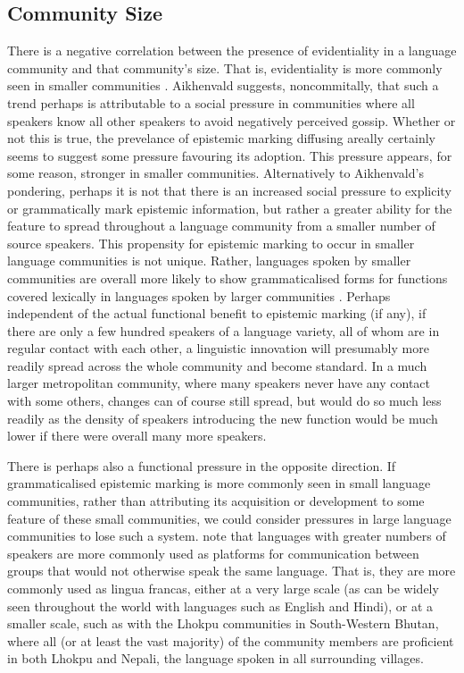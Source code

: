 \subsection{Community Size}\label{ss:History:CommunitySize}
There is a negative correlation between the presence of evidentiality in a language community and that community's size. That is, evidentiality is more commonly seen in smaller communities \cite[359]{Aikhenvald2004}. Aikhenvald suggests, noncommitally, that such a trend perhaps is attributable to a social pressure in communities where all speakers know all other speakers to avoid negatively perceived gossip. Whether or not this is true, the prevelance of epistemic marking diffusing areally certainly seems to suggest some pressure favouring its adoption. This pressure appears, for some reason, stronger in smaller communities. Alternatively to Aikhenvald's pondering, perhaps it is not that there is an increased social pressure to explicity or grammatically mark epistemic information, but rather a greater ability for the feature to spread throughout a language community from a smaller number of source speakers. This propensity for epistemic marking to occur in smaller language communities is not unique. Rather, languages spoken by smaller communities are overall more likely to show grammaticalised forms for functions covered lexically in languages spoken by larger communities \cite{Lupyan2010}. Perhaps independent of the actual functional benefit to epistemic marking (if any), if there are only a few hundred speakers of a language variety, all of whom are in regular contact with each other, a linguistic innovation will presumably more readily spread across the whole community and become standard. In a much larger metropolitan community, where many speakers never have any contact with some others, changes can of course still spread, but would do so much less readily as the density of speakers introducing the new function would be much lower if there were overall many more speakers.

There is perhaps also a functional pressure in the opposite direction. If grammaticalised epistemic marking is more commonly seen in small language communities, rather than attributing its acquisition or development to some feature of these small communities, we could consider pressures in large language communities to lose such a system.  note that languages with greater numbers of speakers are more commonly used as platforms for communication between groups that would not otherwise speak the same language. That is, they are more commonly used as lingua francas, either at a very large scale (as can be widely seen throughout the world with languages such as English and Hindi), or at a smaller scale, such as with the Lhokpu communities in South-Western Bhutan, where all (or at least the vast majority) of the community members are proficient in both Lhokpu and Nepali, the language spoken in all surrounding villages. 

